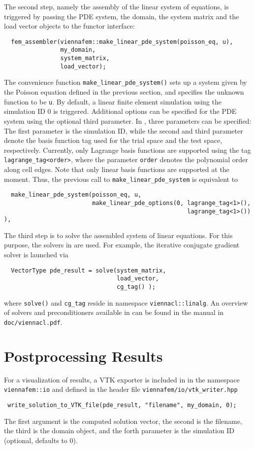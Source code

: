 The second step, namely the assembly of the linear system of equations, is triggered by passing the PDE system, the domain, the system matrix and the load vector objects to the functor interface:
\begin{lstlisting}
  fem_assembler(viennafem::make_linear_pde_system(poisson_eq, u),
                my_domain,
                system_matrix,
                load_vector);
\end{lstlisting}
The convenience function \lstinline|make_linear_pde_system()| sets up a system given by the Poisson equation defined in the previous section, and specifies the unknown function to be \lstinline|u|. By default, a linear finite element simulation using the simulation ID $0$ is triggered.
Additional options can be specified for the PDE system using the optional third parameter. In {\ViennaFEMversion}, three parameters can be specified:
The first parameter is the simulation ID, while the second and third parameter denote the basis function tag used for the trial space and the test space, respectively.
Currently, only Lagrange basis functions are supported using the tag \lstinline|lagrange_tag<order>|, where the parameter \lstinline|order| denotes the polynomial order along cell edges.
Note that only linear basis functions are supported at the moment.
Thus, the previous call to \lstinline|make_linear_pde_system| is equivalent to
\begin{lstlisting}
  make_linear_pde_system(poisson_eq, u,
                         make_linear_pde_options(0, lagrange_tag<1>(),
                                                    lagrange_tag<1>()) ),
\end{lstlisting}

The third step is to solve the assembled system of linear equations. For this purpose, the solvers in {\ViennaCL} are used.
For example, the iterative conjugate gradient solver is launched via
\begin{lstlisting}
  VectorType pde_result = solve(system_matrix,
                                load_vector,
                                cg_tag() );
\end{lstlisting}
where \lstinline|solve()| and \lstinline|cg_tag| reside in namespace \lstinline|viennacl::linalg|.
An overview of solvers and preconditioners available in {\ViennaCL} can be found in the {\ViennaCL} manual in \lstinline|doc/viennacl.pdf|.


\section{Postprocessing Results}
For a visualization of results, a VTK exporter is included in {\ViennaFEM} in the namespace \lstinline|viennafem::io| and defined in the header file \lstinline|viennafem/io/vtk_writer.hpp|
\begin{lstlisting}
 write_solution_to_VTK_file(pde_result, "filename", my_domain, 0);
\end{lstlisting}
The first argument is the computed solution vector, the second is the filename, the third is the domain object, and the forth parameter is the simulation ID (optional, defaults to $0$). 



